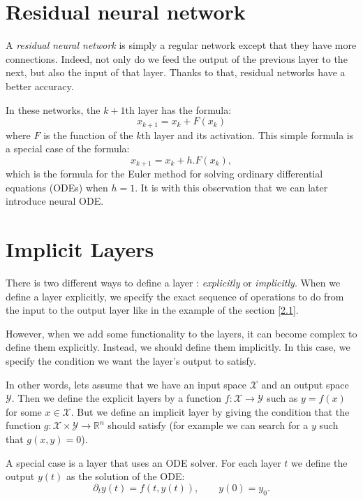\documentclass[10pt,a4paper]{article}
\theoremstyle{definition}
\theoremstyle{definition}
\begin{document}

\section{Residual neural network} \label{rnn}

A \textit{residual neural network} is simply a regular network except that they have more connections. Indeed, not only do we feed the output of the previous layer to the next, but also the input of that layer. Thanks to that, residual networks have a better accuracy. 

In these networks, the $k+1$th layer has the formula:
\[
x_{k+1} = x_k + F(x_k)
\]
where $F$ is the function of the $k$th layer and its activation. This simple formula is a special case of the formula:
\[
x_{k+1} = x_k + h.F(x_k),
\]
which is the formula for the Euler method for solving ordinary differential equations (ODEs) when $h = 1$. It is with this observation that we can later introduce neural ODE.


\section{Implicit Layers}

There is two different ways to define a layer : \textit{explicitly} or \textit{implicitly}. When we define a layer explicitly, we specify the exact sequence of operations to do from the input to the output layer like in the example of the section \ref{2.1}. 

However, when we add some functionality to the layers, it can become complex to define them explicitly. Instead, we should define them implicitly. In this case, we specify the condition we want the layer's output to satisfy. 

In other words, lets assume that we have an input space $\mathcal{X}$ and an output space $\mathcal{Y}$. Then we define the explicit layers by a function $f : \mathcal{X} \rightarrow \mathcal{Y}$ such as $y = f(x)$ for some $x \in \mathcal{X}$. But we define an implicit layer by giving the condition that the function $g: \mathcal{X} \times \mathcal{Y} \rightarrow \mathbb{R}^n$ should satisfy (for example we can search for a $y$ such that $g(x,y) = 0$).

A special case is a layer that uses an ODE solver. For each layer $t$ we define the output $y(t)$ as the solution of the ODE:
$$\partial_t y(t) = f(t, y(t)), \qquad y(0) = y_0.$$
\end{document}
